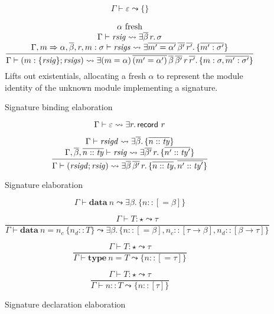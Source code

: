 \documentclass{article}
\begin{document}
\begin{figure}[H]

\[
\Gamma \vdash \varepsilon \leadsto \{ \}
\]

\[
\frac{
\begin{array}{c}
\alpha~\mbox{fresh}\\
\Gamma \vdash \mathit{rsig} \leadsto \exists \overline{\beta}\, r.\, \sigma \\
\Gamma, m \Rightarrow \alpha, \overline{\beta}, r, m : \sigma \vdash \mathit{rsigs} \leadsto \exists \overline{m' = \alpha'}\, \overline{\beta'}\, \overline{r'}.\, \{\overline{m' : \sigma'}\} \\
\end{array}
}{
\Gamma \vdash (m : \{ \mathit{rsig} \}; \mathit{rsigs}) \leadsto \exists (m = \alpha)\, \overline{(m' = \alpha')}\, \overline{\beta}\, \overline{\beta'}\, r\, \overline{r'}.\, \{ m : \sigma, \overline{m' : \sigma'} \}
}
\]
Lifts out existentials, allocating a fresh $\alpha$ to represent
the module identity of the unknown module implementing a signature.
\caption{Signature binding elaboration}
\end{figure}

\begin{figure}[H]

\[
\Gamma \vdash \varepsilon \leadsto \exists r.\, \textsf{record}~r
\]

\[
\frac{
\begin{array}{c}
\Gamma \vdash \mathit{rsigd} \leadsto \exists \overline{\beta}.\, \{ \overline{n :: \mathit{ty}} \} \\
\Gamma, \overline{\beta}, \overline{n :: \mathit{ty}} \vdash \mathit{rsig} \leadsto \exists \overline{\beta'}\, r.\, \{ \overline{n' :: \mathit{ty}'} \} \\
\end{array}
}{
\Gamma \vdash (\mathit{rsigd}; \mathit{rsig}) \leadsto \exists \overline{\beta}\, \overline{\beta'}\, r.\, \{ \overline{n :: \mathit{ty}}, \overline{n' :: \mathit{ty}'} \}
}
\]
\caption{Signature elaboration}
\end{figure}


\begin{figure}[H]

\[
\Gamma \vdash \mathbf{data}~n \leadsto \exists \beta.\, \{ n :: [= \beta] \}
\]

\[
\frac{
\Gamma \vdash T : \star \leadsto \tau
}{
\Gamma \vdash \mathbf{data}~n = n_c~\{ n_d :: T \}
    \leadsto
\exists \beta.\,
\{ n :: [=\beta], n_c :: [\tau \rightarrow \beta], n_d :: [\beta \rightarrow \tau] \}
}
\]

\[
\frac{
\Gamma \vdash T : \star \leadsto \tau
}{
\Gamma \vdash \mathbf{type}~n = T \leadsto \{ n :: [= \tau] \}
}
\]

\[
\frac{
\Gamma \vdash T : \star \leadsto \tau
}{
\Gamma \vdash n :: T \leadsto \{ n :: [\tau] \}
}
\]
\caption{Signature declaration elaboration}
\end{figure}
\end{document}
